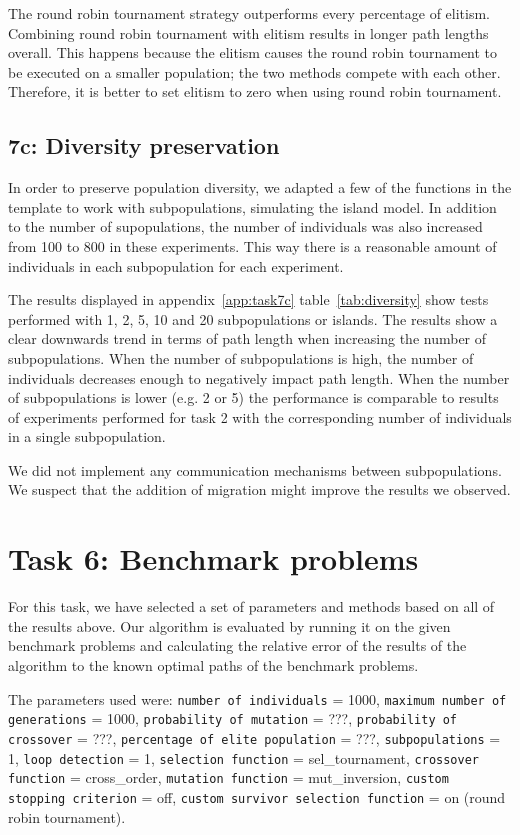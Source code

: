 \documentclass{report}
\begin{document}
The round robin tournament strategy outperforms every percentage of elitism. Combining round robin tournament with elitism results in longer path lengths overall. This happens because the elitism causes the round robin tournament to be executed on a smaller population; the two methods compete with each other. Therefore, it is better to set elitism to zero when using round robin tournament.


\subsection{7c: Diversity preservation}
In order to preserve population diversity, we adapted a few of the functions in the template to work with subpopulations, simulating the island model. In addition to the number of supopulations, the number of individuals was also increased from 100 to 800 in these experiments. This way there is a reasonable amount of individuals in each subpopulation for each experiment. 

The results displayed in appendix~\ref{app:task7c} table~\ref{tab:diversity} show tests performed with 1, 2, 5, 10 and 20 subpopulations or islands. The results show a clear downwards trend in terms of path length when increasing the number of subpopulations. When the number of subpopulations is high, the number of individuals decreases enough to negatively impact path length. When the number of subpopulations is lower (e.g. 2 or 5) the performance is comparable to results of experiments performed for task 2 with the corresponding number of individuals in a single subpopulation.

We did not implement any communication mechanisms between subpopulations. We suspect that the addition of migration might improve the results we observed.

\section{Task 6: Benchmark problems}
For this task, we have selected a set of parameters and methods based on all of the results above. Our algorithm is evaluated by running it on the given benchmark problems and calculating the relative error of the results of the algorithm to the known optimal paths of the benchmark problems. 

The parameters used were: \texttt{number of individuals} = 1000, \texttt{maximum number of generations} = 1000, \texttt{probability of mutation} = ???, \texttt{probability of crossover} = ???, \texttt{percentage of elite population} = ???, \texttt{subpopulations} = 1, \texttt{loop detection} = 1, \texttt{selection function} = sel\_tournament, \texttt{crossover function} = cross\_order, \texttt{mutation function} = mut\_inversion, \texttt{custom stopping criterion} = off, \texttt{custom survivor selection function} = on (round robin tournament).
\end{document}
